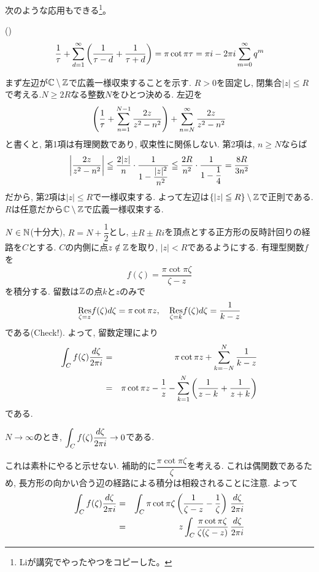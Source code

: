 次のような応用もできる\footnote{Liが講究でやったやつをコピーした。}。
\begin{egprob} ()
\begin{equation} \label{equation:1.1}
\dfrac{1}{\tau} + \sum_{d=1}^{\infty} \left( \dfrac{1}{\tau - d} + \dfrac{1}{\tau + d} \right) = \pi \cot{\pi\tau} = \pi i - 2\pi i \sum_{m=0}^{\infty} q^m
\end{equation}
\end{egprob}
\prf
{}
まず左辺が$\mathbb{C}\setminus{\mathbb{Z}}$で広義一様収束することを示す. $R>0$を固定し, 閉集合$|z| \leq R$で考える.$N\geq 2R$なる整数$N$をひとつ決める. 左辺を
\[\left( \dfrac{1}{\tau} + \sum_{n=1}^{N-1} \dfrac{2z}{z^2-n^2}  \right)+ \sum_{n=N}^{\infty} \dfrac{2z}{z^2-n^2}\]
と書くと, 第1項は有理関数であり, 収束性に関係しない.  第2項は, $n\geq N$ならば
\[\left| \dfrac{2z}{z^2-n^2} \right| \leqq \dfrac{2|z|}{n}\cdot \dfrac{1}{1-\dfrac{|z|^2}{n^2}} \leqq \dfrac{2R}{n^2}\cdot \dfrac{1}{1- \dfrac{1}{4}} = \dfrac{8R}{3n^2}\]
だから, 第2項は$|z|\leq R$で一様収束する. よって左辺は$\{ |z| \leqq R \}\setminus{\mathbb{Z}}$で正則である. $R$は任意だから$\mathbb{C}\setminus{\mathbb{Z}}$で広義一様収束する. \par
$N\in \mathbb{N}$(十分大), $R=N+\dfrac{1}{2}$とし, $\pm R \pm Ri$を頂点とする正方形の反時計回りの経路を$C$とする. $C$の内側に点$z\notin \mathbb{Z}$を取り, $|z| < R$であるようにする. 有理型関数$f$を
\[f(\zeta) = \dfrac{\pi \cot{\pi\zeta}}{\zeta-z}\]
を積分する. 留数は$\mathbb{Z}$の点$k$と$z$のみで
\[\underset{\zeta = z}{\mathrm{Res}}f(\zeta)d\zeta = \pi \cot{\pi z},\quad \underset{\zeta=k}{\mathrm{Res}}f(\zeta)d\zeta = \dfrac{1}{k-z} \]
である(Check!). よって, 留数定理により
\begin{eqnarray*}
\int_{C}f(\zeta) \dfrac{d\zeta}{2\pi i} &=& \pi\cot{\pi z} + \sum_{k=-N}^{N} \dfrac{1}{k-z}\\
&=& \pi\cot{\pi z} - \dfrac{1}{z} - \sum_{k=1}^{N} \left( \dfrac{1}{z-k} + \dfrac{1}{z+k} \right)
\end{eqnarray*}
である.
\begin{claim}
$N\to \infty$のとき, $\displaystyle\int_{C} f(\zeta) \dfrac{d\zeta}{2\pi i} \to 0$である.
\end{claim}
\prf  これは素朴にやると示せない. 補助的に$\dfrac{\pi\cot{\pi\zeta}}{\zeta}$を考える. これは偶関数であるため, 長方形の向かい合う辺の経路による積分は相殺されることに注意. よって
\begin{eqnarray*}
\int_{C}f(\zeta) \dfrac{d\zeta}{2\pi i} &=& \int_{C} \pi\cot{\pi \zeta}\left( \dfrac{1}{\zeta - z} - \dfrac{1}{\zeta} \right)\, \dfrac{d\zeta}{2\pi i}\\
&=& z \int_{C} \dfrac{\pi\cot{\pi \zeta}}{\zeta(\zeta - z)} \, \dfrac{d\zeta}{2\pi i}
\end{eqnarray*}
